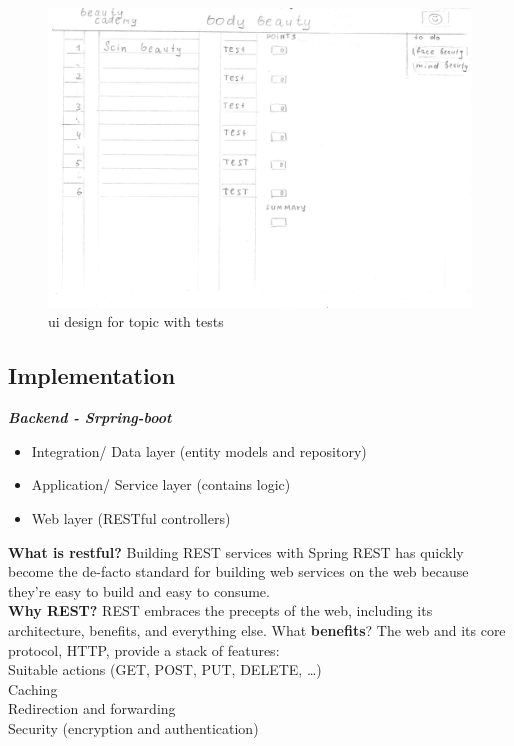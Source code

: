 \documentclass{scrartcl}
\begin{document}
\begin{figure}[H]
\centering
\includegraphics[width = 140mm]{proto-foto/ui-test-topic.JPG}
\caption{ui design for topic with tests}
\label{topics page}
\end{figure}


\subsection{Implementation}

\textbf{\textit{Backend - Srpring-boot }}

\begin{itemize}
	\item Integration/ Data layer (entity models and repository)	
	
	\item	Application/ Service layer (contains logic)
	\item  Web layer (RESTful controllers)

\end{itemize}

\textbf{What is restful?}
Building REST services with Spring
REST has quickly become the de-facto standard for building web services on the web because they’re easy to build and easy to consume.\\
\textbf{Why REST?} REST embraces the precepts of the web, including its architecture, benefits, and everything else.
What \textbf{benefits}? The web and its core protocol, HTTP, provide a stack of features:\\
Suitable actions (GET, POST, PUT, DELETE, …​)\\
Caching\\
Redirection and forwarding\\
Security (encryption and authentication)\\
\end{document}
